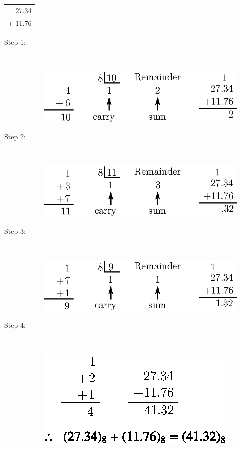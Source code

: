 \begin{solution}
\begin{itemize}
\begin{tabular}{r}
27.34\\
+ 11.76\\
\hline
\end{tabular}
\begin{description}
\item[Step 1:]
~
\begin{figure}[H]
\centering
\includegraphics{chap6/fig31.eps}
\end{figure}

\item[Step 2:]
~
\begin{figure}[H]
\centering
\includegraphics{chap6/fig32.eps}
\end{figure}

\item[Step 3:]
~
\begin{figure}[H]
\centering
\includegraphics{chap6/fig33.eps}
\end{figure}

\eject

\item[Step 4:]
~
\begin{figure}[H]
\centering
\includegraphics{chap6/fig34.eps}
\end{figure}
\end{description}
\end{itemize}
\vskip -1cm
\end{solution}

